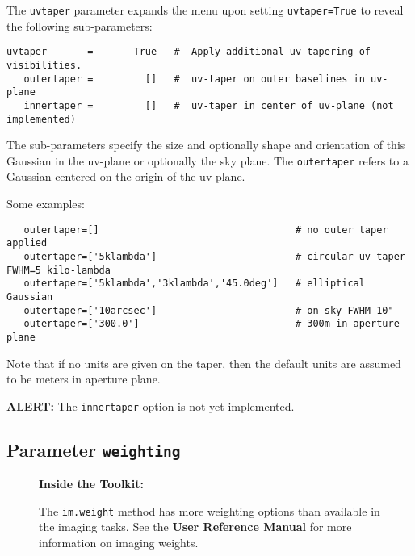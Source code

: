 The {\tt uvtaper} parameter expands the menu upon setting {\tt uvtaper=True} 
to reveal the following sub-parameters:
\small
\begin{verbatim}
uvtaper       =       True   #  Apply additional uv tapering of  visibilities.
   outertaper =         []   #  uv-taper on outer baselines in uv-plane
   innertaper =         []   #  uv-taper in center of uv-plane (not
implemented)
\end{verbatim}
\normalsize
The sub-parameters specify the size and optionally shape and
orientation of this Gaussian in the uv-plane or optionally the
sky plane.  The {\tt outertaper} refers to a Gaussian centered on 
the origin of the uv-plane.

Some examples:
\small
\begin{verbatim}
   outertaper=[]                                  # no outer taper applied
   outertaper=['5klambda']                        # circular uv taper FWHM=5 kilo-lambda
   outertaper=['5klambda','3klambda','45.0deg']   # elliptical Gaussian
   outertaper=['10arcsec']                        # on-sky FWHM 10"
   outertaper=['300.0']                           # 300m in aperture plane
\end{verbatim}
\normalsize
Note that if no units are given on the taper, then the default units
are assumed to be meters in aperture plane.

{\bf ALERT:} The {\tt innertaper} option is not yet implemented. 


\subsection{Parameter {\tt weighting} }
\label{section:im.pars.weighting}

\begin{wrapfigure}{r}{2.5in}
  \begin{boxedminipage}{2.5in}
     \centerline{\bf Inside the Toolkit:}
     The {\tt im.weight} method has more weighting options
     than available in the imaging tasks.  See the 
     {\bf User Reference Manual} for more information on
     imaging weights.
  \end{boxedminipage}
\end{wrapfigure}

